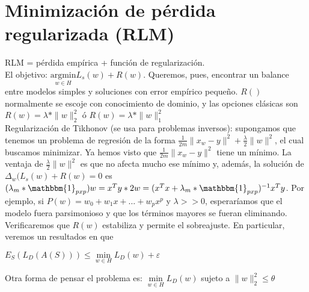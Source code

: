 \section{Minimización de pérdida regularizada (RLM)}
RLM = pérdida empírica + función de regularización.
\\

El objetivo: $\underset{w \in H}{\mbox{argmin}} L_s(w)+R(w)$. Queremos, pues, encontrar un balance entre modelos simples y soluciones con error empírico pequeño.
$R()$ normalmente se escoje con conocimiento de dominio, y las opciones clásicas son $R(w) = \lambda*\|w\|^2_2$ ó $R(w) = \lambda*\|w\|^2_1$
\\

Regularización de Tikhonov (se usa para problemas inversos): supongamos que tenemos un problema de regresión de la forma $\frac{1}{2m}\|x_w-y\|^2 + \frac{\lambda}{2}\|w\|^2$, el cual buscamos minimizar.
Ya hemos visto que $\frac{1}{2m}\|x_w-y\|^2$ tiene un mínimo. La ventaja de $\frac{\lambda}{2}\|w\|^2$ es que no afecta mucho ese mínimo y, además, la solución de $\Delta_w(L_s(w)+R(w)=0$ es $(\lambda_m*\mathbbm{1}_{pxp})w = x^Ty*2w = (x^Tx +\lambda_m*\mathbbm{1}_{pxp})^{-1}x^Ty $.
Por ejemplo, si $P(w) = w_0+w_1x+\dots+w_px^p$ y $\lambda >> 0 $, esperaríamos que el modelo fuera parsimonioso y que los términos mayores se fueran eliminando.
\\

Verificaremos que $R(w)$ estabiliza y permite el sobreajuste. En particular, veremos un resultados en que 
\begin{center}
    $E_S(L_D(A(S))) \leq \underset{w \in H}{\min} L_D(w) + \varepsilon$
\end{center}

Otra forma de pensar el problema es: $\underset{w \in H}{\min} L_D(w)$ sujeto a $\|w\|^2_2 \leq \theta$

